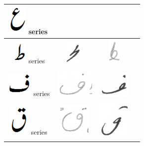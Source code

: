 \begin{table}[h]
\begin{tabular}{@{}cccc@{}}
\hline
\includegraphics[scale=0.15]{aien_orig} series & 
& &  \\
\hline
\includegraphics[scale=0.15]{tuay_orig} series & \includegraphics[scale=0.15]{98} & \includegraphics[scale=0.15]{99}  &  \\
\hline
\includegraphics[scale=0.25]{fay_orig} series & \includegraphics[scale=0.25]{100} & \includegraphics[scale=0.25]{101}  &  \\
\hline
\includegraphics[scale=0.20]{qaaf_orig} series & \includegraphics[scale=0.15]{102} & 
\includegraphics[scale=0.15]{103} & \\

\end{tabular}
\end{table}
